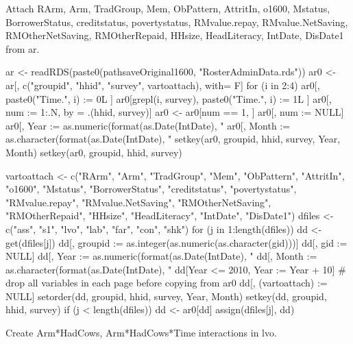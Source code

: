 Attach \textsf{RArm, Arm, TradGroup, Mem, ObPattern, AttritIn, o1600, Mstatus, BorrowerStatus, creditstatus, povertystatus, RMvalue.repay, RMvalue.NetSaving, RMOtherNetSaving, RMOtherRepaid, HHsize, HeadLiteracy, IntDate, DisDate1} from \textsf{ar}.
\begin{Schunk}
\begin{Sinput}
ar <- readRDS(paste0(pathsaveOriginal1600, "RosterAdminData.rds"))
ar0 <- ar[, c("groupid", "hhid", "survey", vartoattach), with= F]
for (i in 2:4) {
  ar0[, paste0("Time.", i) := 0L ]
  ar0[grepl(i, survey), paste0("Time.", i) := 1L ]
}
ar0[, num := 1:.N, by = .(hhid, survey)]
ar0 <- ar0[num == 1, ]
ar0[, num := NULL]
ar0[, Year :=  as.numeric(format(as.Date(IntDate), "%Y"))]
ar0[, Month := as.character(format(as.Date(IntDate), "%B"))]
setkey(ar0, groupid, hhid, survey, Year, Month)
setkey(ar0, groupid, hhid, survey)
\end{Sinput}
\end{Schunk}
\begin{Schunk}
\begin{Sinput}
vartoattach <- c("RArm", "Arm", "TradGroup", "Mem", 
  "ObPattern", "AttritIn", "o1600", "Mstatus", "BorrowerStatus", 
  "creditstatus", "povertystatus", "RMvalue.repay", 
  "RMvalue.NetSaving", "RMOtherNetSaving", "RMOtherRepaid",
  "HHsize", "HeadLiteracy", "IntDate", "DisDate1")
dfiles <- c("ass", "s1", "lvo", "lab", "far", "con", "shk")
for (j in 1:length(dfiles)) {
  dd <- get(dfiles[j])
  dd[, groupid := as.integer(as.numeric(as.character(gid)))]
  dd[, gid := NULL]
  dd[, Year :=  as.numeric(format(as.Date(IntDate), "%Y"))]
  dd[, Month := as.character(format(as.Date(IntDate), "%B"))]
  dd[Year <= 2010, Year := Year + 10]
  # drop all variables in each page before copying from ar0
  dd[, (vartoattach) := NULL]
  setorder(dd, groupid, hhid, survey, Year, Month)
  setkey(dd, groupid, hhid, survey)
  if (j < length(dfiles)) dd <- ar0[dd]
  assign(dfiles[j], dd)
}
\end{Sinput}
\end{Schunk}
Create \textsf{Arm*HadCows}, \textsf{Arm*HadCows*Time} interactions in \textsf{lvo}. \gobblepars
